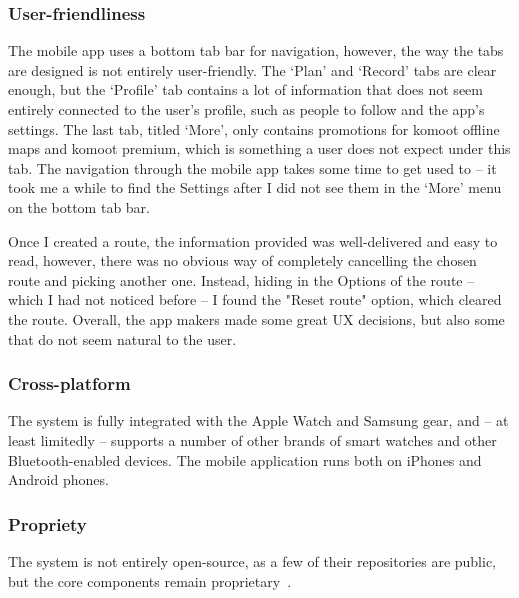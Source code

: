 \subsubsection*{User-friendliness}
The mobile app uses a bottom tab bar for navigation, however, the way the tabs are designed is not entirely user-friendly.
The `Plan' and `Record' tabs are clear enough, but the `Profile' tab contains a lot of information that does not seem entirely connected to the user's profile, such as people to follow and the app's settings.
The last tab, titled `More', only contains promotions for komoot offline maps and komoot premium, which is something a user does not expect under this tab.
The navigation through the mobile app takes some time to get used to -- it took me a while to find the Settings after I did not see them in the `More' menu on the bottom tab bar.

Once I created a route, the information provided was well-delivered and easy to read, however, there was no obvious way of completely cancelling the chosen route and picking another one.
Instead, hiding in the Options of the route -- which I had not noticed before -- I found the "Reset route" option, which cleared the route.
Overall, the app makers made some great UX decisions, but also some that do not seem natural to the user.
\subsubsection*{Cross-platform}
The system is fully integrated with the Apple Watch and Samsung gear, and -- at least limitedly -- supports a number of other brands of smart watches and other Bluetooth-enabled devices.
The mobile application runs both on iPhones and Android phones.
\subsubsection*{Propriety}
The system is not entirely open-source, as a few of their repositories are public, but the core components remain proprietary~\cite{komoot-github}.

